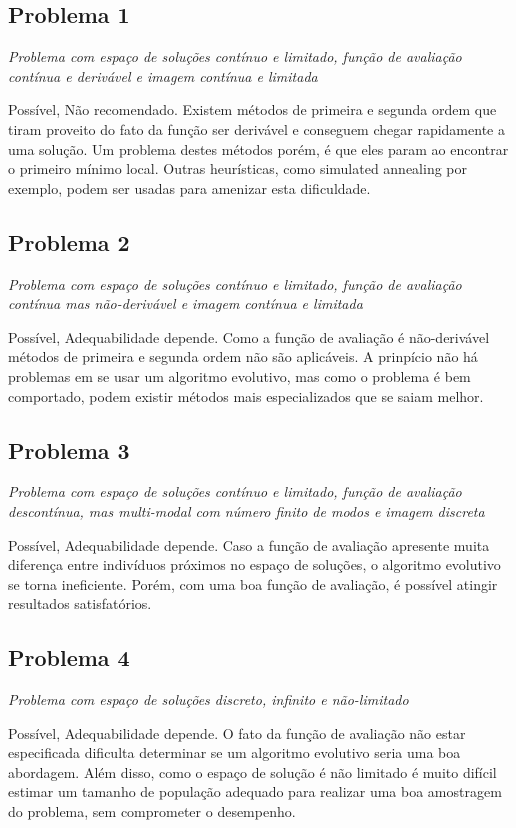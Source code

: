 \documentclass[a4paper]{article}
\begin{document}
\subsection{Problema 1}
\textit{Problema com espaço de soluções contínuo e limitado, função de avaliação contínua e derivável e imagem contínua e limitada }

\textsf{Possível}, \textsf{Não recomendado}. Existem métodos de primeira e segunda ordem que tiram proveito do fato da função ser derivável e conseguem chegar rapidamente a uma solução. Um problema destes métodos porém, é que eles param ao encontrar o primeiro mínimo local. Outras heurísticas, como simulated annealing por exemplo, podem ser usadas para amenizar esta dificuldade.

\subsection{Problema 2}
\textit{Problema com espaço de soluções contínuo e limitado, função de avaliação contínua mas 
não-derivável e imagem contínua e limitada }

\textsf{Possível}, \textsf{Adequabilidade depende}. Como a função de avaliação é não-derivável métodos de primeira e segunda ordem não são aplicáveis. A prinpício não há problemas em se usar um algoritmo evolutivo, mas como o problema é bem comportado, podem existir métodos mais especializados que se saiam melhor.

\subsection{Problema 3}
\textit{Problema com espaço de soluções contínuo e limitado, função de avaliação descontínua, mas multi-modal com número finito de modos e imagem discreta }

\textsf{Possível}, \textsf{Adequabilidade depende}. Caso a função de avaliação apresente muita diferença entre indivíduos próximos no espaço de soluções, o algoritmo evolutivo se torna ineficiente. Porém, com uma boa função de avaliação, é possível atingir resultados satisfatórios. 

\subsection{Problema 4}
\textit{Problema com espaço de soluções discreto, infinito e não-limitado }

\textsf{Possível}, \textsf{Adequabilidade depende}. O fato da função de avaliação não estar especificada dificulta determinar se um algoritmo evolutivo seria uma boa abordagem. Além disso, como o espaço de solução é não limitado é muito difícil estimar um tamanho de população adequado para realizar uma boa amostragem do problema, sem comprometer o desempenho.
\end{document}
